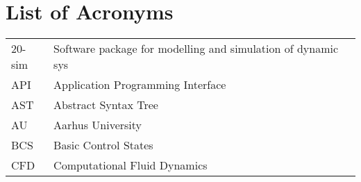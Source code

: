 \section{List of Acronyms}\label{appendix:acronyms}
\begin{longtable}{ll}
20-sim	& Software package for modelling and simulation of dynamic sys\allowbreak\@tems\\
API & Application Programming Interface \\
AST     & Abstract Syntax Tree\\
AU      & Aarhus University\\
BCS & Basic Control States \\
CFD & Computational Fluid Dynamics\\

\end{longtable}
